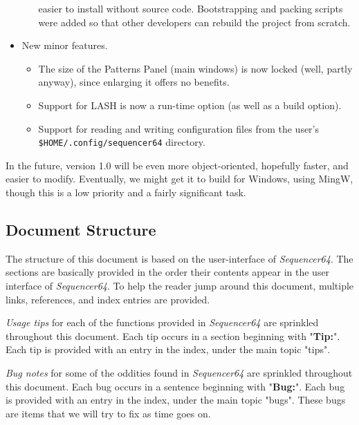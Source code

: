 \documentclass[
 11pt,
 twoside,
 a4paper,
 headinclude,
 footinclude,
 final                                 %
]{article}
\begin{document}
\begin{itemize}
\begin{itemize}
            easier to install without source code.  Bootstrapping and
            packing scripts were added so that other developers can rebuild the
            project from scratch.
      \end{itemize}
      \item New minor features.
      \begin{itemize}
         \item The size of the Patterns Panel (main windows) is now locked
            (well, partly anyway), since enlarging it offers no benefits.
         \item Support for LASH is now a run-time option (as well as a build
            option).
         \item Support for reading and writing configuration files from the
            user's \texttt{\$HOME/.config/sequencer64} directory.
      \end{itemize}
   \end{itemize}

   In the future, version 1.0 will be even more object-oriented, hopefully
   faster, and easier to modify.  Eventually, we might get it to build
   for Windows, using MingW, though this is a low priority and a fairly
   significant task.

\subsection{Document Structure}
\label{subsec:introduction_document_structure}

   The structure of this document is based on the user-interface of
   \textsl{Sequencer64}.  The sections are basically provided in the order
   their contents appear in the user interface of \textsl{Sequencer64}.  To
   help the reader jump around this document, multiple links, references,
   and index entries are provided.

   \textsl{Usage tips}
   for each of the functions provided in
   \textsl{Sequencer64} are sprinkled throughout this document.
   Each tip occurs in a section beginning with "\textbf{Tip:}".
   Each tip is provided with an entry in the index, under the
   main topic "tips".

   \textsl{Bug notes}
   for some of the oddities found in \textsl{Sequencer64} are
   sprinkled throughout this document.
   Each bug occurs in a sentence beginning with "\textbf{Bug:}".
   Each bug is provided with an entry in the index, under the
   main topic "bugs".  These bugs are items that we will try to
   fix as time goes on.
\end{document}
